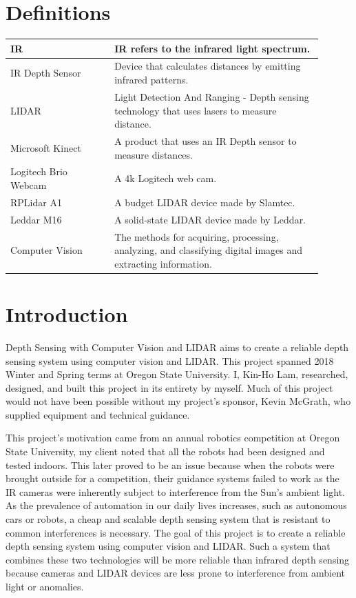 \documentclass[onecolumn, draftclsnofoot,10pt, compsoc]{IEEEtran}
\begin{document}
\begin{singlespace}



	\section{Definitions}
		\begin{longtable}{|p{0.3\linewidth}|p{0.6\linewidth}|} \hline 
			IR & IR refers to the infrared light spectrum. \label{def:IR} \\\hline
			IR Depth Sensor & Device that calculates distances by emitting infrared patterns. \label{def:depthsensor} \\\hline
			LIDAR & Light Detection And Ranging - Depth sensing technology that uses lasers to measure distance. \label{def:lidar} \\\hline
			Microsoft Kinect & A product that uses an IR Depth sensor to measure distances. \label{def:kinect} \\\hline
			Logitech Brio Webcam & A 4k Logitech web cam. \cite{logitech} \label{def:brio} \\\hline
			RPLidar A1 & A budget LIDAR device made by Slamtec. \cite{slamtec} \label{def:rplidar} \\\hline
			Leddar M16 & A solid-state LIDAR device made by Leddar. \cite{leddartech} \label{def:m16} \\\hline
			Computer Vision & The methods for acquiring, processing, analyzing, and classifying digital images and extracting information. \label{def:vision}\\\hline
		\end{longtable}

	\section{Introduction}
		Depth Sensing with Computer Vision and LIDAR aims to create a reliable depth sensing system using computer vision and LIDAR. 
		This project spanned 2018 Winter and Spring terms at Oregon State University.
		I, Kin-Ho Lam, researched, designed, and built this project in its entirety by myself. 
		Much of this project would not have been possible without my project's sponsor, Kevin McGrath, who supplied equipment and technical guidance.
		

		This project's motivation came from an annual robotics competition at Oregon State University, my client noted that all the robots had been designed and tested indoors.
		This later proved to be an issue because when the robots were brought outside for a competition, their guidance systems failed to work as the IR cameras were inherently subject to interference from the Sun's ambient light.
		As the prevalence of automation in our daily lives increases, such as autonomous cars or robots, a cheap and scalable depth sensing system that is resistant to common interferences is necessary.
		The goal of this project is to create a reliable depth sensing system using computer vision and LIDAR.
		Such a system that combines these two technologies will be more reliable than infrared depth sensing because cameras and LIDAR devices are less prone to interference from ambient light or anomalies.


\end{singlespace}
\end{document}

